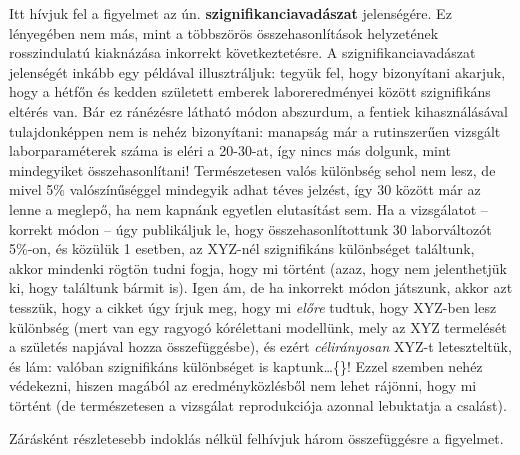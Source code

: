 \documentclass[]{book}
\begin{document}
Itt hívjuk fel a figyelmet az ún. \textbf{szignifikanciavadászat} jelenségére. Ez lényegében nem más, mint a többszörös összehasonlítások helyzetének rosszindulatú kiaknázása inkorrekt következtetésre. A szignifikanciavadászat jelenségét inkább egy példával illusztráljuk: tegyük fel, hogy bizonyítani akarjuk, hogy a hétfőn és kedden született emberek laboreredményei között szignifikáns eltérés van. Bár ez ránézésre látható módon abszurdum, a fentiek kihasználásával tulajdonképpen nem is nehéz bizonyítani: manapság már a rutinszerűen vizsgált laborparaméterek száma is eléri a 20-30-at, így nincs más dolgunk, mint mindegyiket összehasonlítani! Természetesen valós különbség sehol nem lesz, de mivel 5\% valószínűséggel mindegyik adhat téves jelzést, így 30 között már az lenne a meglepő, ha nem kapnánk egyetlen elutasítást sem. Ha a vizsgálatot -- korrekt módon -- úgy publikáljuk le, hogy összehasonlítottunk 30 laborváltozót 5\%-on, és közülük 1 esetben, az XYZ-nél szignifikáns különbséget találtunk, akkor mindenki rögtön tudni fogja, hogy mi történt (azaz, hogy nem jelenthetjük ki, hogy találtunk bármit is). Igen ám, de ha inkorrekt módon játszunk, akkor azt tesszük, hogy a cikket úgy írjuk meg, hogy mi \emph{előre} tudtuk, hogy XYZ-ben lesz különbség (mert van egy ragyogó kórélettani modellünk, mely az XYZ termelését a születés napjával hozza összefüggésbe), és ezért \emph{célirányosan} XYZ-t leteszteltük, és lám: valóban szignifikáns különbséget is kaptunk\dots\{\}! Ezzel szemben nehéz védekezni, hiszen magából az eredményközlésből nem lehet rájönni, hogy mi történt (de természetesen a vizsgálat reprodukciója azonnal lebuktatja a csalást).

Zárásként részletesebb indoklás nélkül felhívjuk három összefüggésre a figyelmet.
\end{document}
